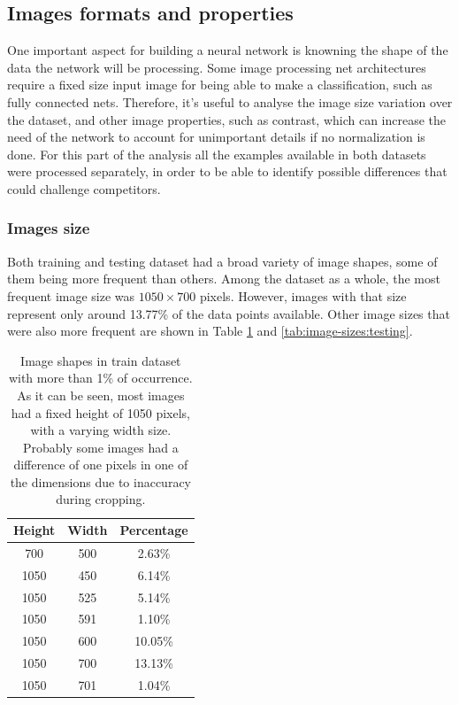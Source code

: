 \documentclass[12pt,
    brazil,			%
	english,        %
	]{article}
\begin{document}
\subsection{Images formats and properties}

One important aspect for building a neural network is knowning the shape of the data the network will be processing. Some image processing net architectures require a fixed size input image for being able to make a classification, such as fully connected nets. Therefore, it's useful to analyse the image size variation over the dataset, and other image properties, such as contrast, which can increase the need of the network to account for unimportant details if no normalization is done. For this part of the analysis all the examples available in both datasets were processed separately, in order to be able to identify possible differences that could challenge competitors.

\subsubsection{Images size}

Both training and testing dataset had a broad variety of image shapes, some of them being more frequent than others. Among the dataset as a whole, the most frequent image size was $1050 \times 700$ pixels. However, images with that size represent only around 13.77\% of the data points available. Other image sizes that were also more frequent are shown in Table \ref{tab:image-sizes:training} and \ref{tab:image-sizes:testing}.

\begin{table}[htb]
    \centering
    \setlength{\tabcolsep}{25pt} %
    \renewcommand{\arraystretch}{1.5} %
    \begin{tabular}{ccc}
        \hline \hline
        Height & Width & Percentage \\
        \hline
        700	&   500 &	2.63\% \\
        1050 &  450 &	6.14\% \\
        1050 &  525 &	5.14\% \\
        1050 &  591 &	1.10\% \\
        1050 &  600 &	10.05\% \\
        1050 &  700 &	13.13\% \\
        1050 &  701 &	1.04\% \\
        \hline \hline
    \end{tabular}
    \caption{Image shapes in train dataset with more than 1\% of occurrence. As it can be seen, most images had a fixed height of 1050 pixels, with a varying width size. Probably some images had a difference of one pixels in one of the dimensions due to inaccuracy during cropping.}
    \label{tab:image-sizes:training}
\end{table}
\end{document}
